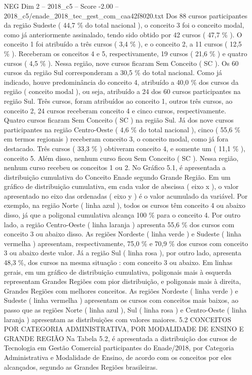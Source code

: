 \begin{textsample}{NEG Dim 2 – 2018\_c5 – Score -2.00 – 2018\_c5/enade\_2018\_tec\_gest\_com\_caa42f8020.txt}
Dos 88 cursos participantes da região Sudeste ( 44,7 \% do total nacional ), o conceito 3 foi o conceito modal, como já anteriormente assinalado, tendo sido obtido por 42 cursos ( 47,7 \% ).
O conceito 1 foi atribuído a três cursos ( 3,4 \% ), e o conceito 2, a 11 cursos ( 12,5 \% ).
Receberam os conceitos 4 e 5, respectivamente, 19 cursos ( 21,6 \% ) e quatro cursos ( 4,5 \% ).
Nessa região, nove cursos ficaram Sem Conceito ( SC ).
Os 60 cursos da região Sul corresponderam a 30,5 \% do total nacional.
Como já indicado, houve predominância do conceito 4, atribuído a 40,0 \% dos cursos da região ( conceito modal ), ou seja, atribuído a 24 dos 60 cursos participantes na região Sul.
Três cursos, foram atribuídos ao conceito 1, outros três cursos, ao conceito 2, 24 cursos receberam conceito 4 e cinco cursos, respectivamente.
Quatro cursos ficaram Sem Conceito ( SC ) na região Sul.
Já dos nove cursos participantes na região Centro-Oeste ( 4,6 \% do total nacional ), cinco ( 55,6 \% em termos regionais ) receberam conceito 3, o conceito modal, como já fora destacado.
Três cursos ( 33,3 \% ) obtiveram conceito 4, e somente um ( 11,1 \% ), conceito 5.
Além disso, nenhum curso ficou Sem Conceito ( SC ).
Nessa região, nenhum curso recebeu os conceitos 1 ou 2.
No Gráfico 5.1, é apresentada a distribuição cumulativa do Conceito Enade segundo Grande Região.
Em um gráfico de distribuição cumulativa, em cada valor de abscissa ( eixo x ), o valor apresentado no eixo das ordenadas ( eixo y ) é o valor acumulado da variável.
Por exemplo, na região Norte ( linha azul ), todos os cursos têm conceito 4 ou abaixo disso, já que a poligonal cumulativa alcança 100 \% para o conceito 4.
Por outro lado, a região Centro-Oeste ( linha laranja ) apresenta 55,6 \% dos cursos com conceito 3 ou abaixo disso.
As regiões Nordeste ( linha verde ) e Sudeste ( linha vermelha ) apresentam, respectivamente, 75,0 \% e 70,9 \% dos cursos com conceito 3 ou abaixo deste valor.
Já a região Sul ( linha rosa ), por outro lado, apresenta 48,3 \%, dos cursos na mesma situação : com conceito 3 ou abaixo.
Em linhas gerais, em um gráfico de distribuição cumulativa, poligonais mais à esquerda representam Grandes Regiões com pior distribuição, e poligonais mais à direita, Grandes Regiões com melhores conceitos.
As regiões Nordeste ( linha verde ) e Sudeste ( linha vermelha ) apresentam os cursos com conceitos mais baixos, ao passo que as regiões Norte ( linha azul ), Sul ( linha rosa ) e Centro-Oeste ( linha laranja ) apresentam as distribuições com valores maiores. 5.2 CONCEITOS POR CATEGORIA ADMINISTRATIVA, POR MODALIDADE DE ENSINO E GRANDE REGIÃO Na Tabela 5.2, é apresentada a distribuição dos cursos de Tecnologia em Gestão Comercial participantes do Enade/2018, por Categoria Administrativa e Modalidade de Ensino, de acordo com os conceitos por eles alcançados, segundo as Grandes Regiões brasileiras.

\end{textsample}
